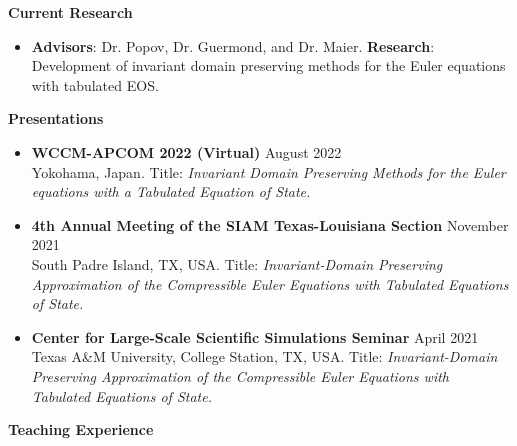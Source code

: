 \documentclass[letterpaper,10pt]{article}
\newcommand{\resheading}[1]{{\large \colorbox{mygrey}{\begin{minipage}{\textwidth}{\textbf{#1 \vphantom{p\^{E}}}}\end{minipage}}}}
\begin{document}
\resheading{Current Research}

\begin{itemize}
\item \textbf{Advisors}: Dr. Popov, Dr. Guermond, and Dr.
	Maier. \textbf{Research}: Development of invariant
	domain preserving methods for the Euler equations
	with tabulated EOS. 
\end{itemize}
\vspace{0.5cm}


\resheading{Presentations}
\begin{itemize}
\item \textbf{WCCM-APCOM 2022 (Virtual)} \hfill August
	2022\\ Yokohama, Japan.  Title: \textit{Invariant
		Domain Preserving Methods for the Euler
		equations with a Tabulated Equation of
	State.}
\item \textbf{4th Annual Meeting of the SIAM Texas-Louisiana
		Section} \hfill November 2021\\ South Padre
		Island, TX, USA.  Title:
		\textit{Invariant-Domain Preserving
			Approximation of the Compressible
			Euler Equations with Tabulated
		Equations of State.} 
\item \textbf{Center for Large-Scale Scientific Simulations
		Seminar} \hfill April 2021 \\ Texas A\&M
		University, College Station, TX, USA. Title:
		\textit{Invariant-Domain Preserving
			Approximation of the Compressible
		Euler Equations with Tabulated Equations of
	State.} 
\end{itemize}


\resheading{Teaching Experience}
\vspace{0.4cm}
\end{document}
